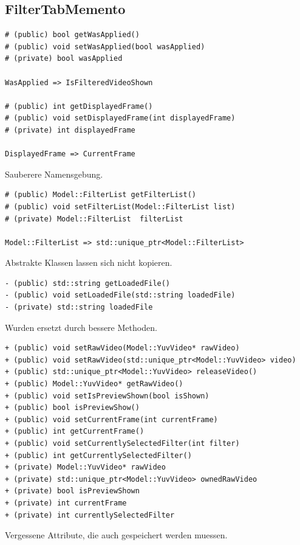 \documentclass[parskip=full]{scrartcl}
\begin{document}
\subsection{FilterTabMemento}
\begin{verbatim}
# (public) bool getWasApplied()
# (public) void setWasApplied(bool wasApplied)
# (private) bool wasApplied

WasApplied => IsFilteredVideoShown

# (public) int getDisplayedFrame()
# (public) void setDisplayedFrame(int displayedFrame)
# (private) int displayedFrame

DisplayedFrame => CurrentFrame

\end{verbatim}
Sauberere Namensgebung.
\begin{verbatim}
# (public) Model::FilterList getFilterList()
# (public) void setFilterList(Model::FilterList list)
# (private) Model::FilterList  filterList

Model::FilterList => std::unique_ptr<Model::FilterList>
\end{verbatim}
Abstrakte Klassen lassen sich nicht kopieren.
\begin{verbatim}
- (public) std::string getLoadedFile()
- (public) void setLoadedFile(std::string loadedFile)
- (private) std::string loadedFile
\end{verbatim}
Wurden ersetzt durch bessere Methoden.
\begin{verbatim}
+ (public) void setRawVideo(Model::YuvVideo* rawVideo)
+ (public) void setRawVideo(std::unique_ptr<Model::YuvVideo> video)
+ (public) std::unique_ptr<Model::YuvVideo> releaseVideo()
+ (public) Model::YuvVideo* getRawVideo()
+ (public) void setIsPreviewShown(bool isShown)
+ (public) bool isPreviewShow()
+ (public) void setCurrentFrame(int currentFrame)
+ (public) int getCurrentFrame()
+ (public) void setCurrentlySelectedFilter(int filter)
+ (public) int getCurrentlySelectedFilter()
+ (private) Model::YuvVideo* rawVideo
+ (private) std::unique_ptr<Model::YuvVideo> ownedRawVideo
+ (private) bool isPreviewShown
+ (private) int currentFrame
+ (private) int currentlySelectedFilter
\end{verbatim}
Vergessene Attribute, die auch gespeichert werden muessen.
\end{document}
